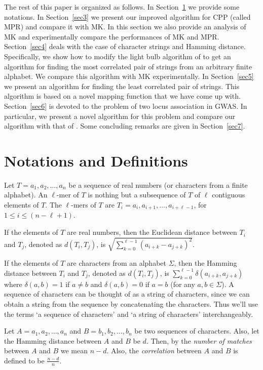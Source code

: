 \documentclass{article}
\theoremstyle{definition}
\theoremstyle{remark}
\begin{document}
The rest of this paper is organized as follows. In Section~\ref{sec2} we provide some notations. In Section~\ref{sec3} we present our improved algorithm for CPP (called MPR) and compare it with MK. In this section we also provide an analysis of MK and experimentally compare the performances of MK and MPR. Section~\ref{sec4} deals with the case of character strings and Hamming distance. Specifically, we show how to modify the light bulb algorithm of \cite{RSJ89} to get an algorithm for finding the most correlated pair of strings from an arbitrary finite alphabet. We compare this algorithm with MK experimentally. In Section~\ref{sec5} we present an algorithm for finding the least correlated pair of strings. This algorithm is based on a novel mapping function that we have come up with. Section~\ref{sec6} is devoted to the problem of two locus association in GWAS. In particular, we present a novel algorithm for this problem and compare our algorithm with that of \cite{PBK11}. Some concluding remarks are given in Section~\ref{sec7}.

\section{Notations and Definitions}\label{sec2}
Let $T=a_1,a_2,\ldots,a_n$ be a sequence of real numbers (or characters from a finite alphabet). An $\ell$-mer of $T$ is nothing but a subsequence of $T$ of $\ell$ contiguous elements of $T$. The $\ell$-mers of $T$ are $T_i=a_i,a_{i+1},\ldots,a_{i+\ell-1}$, for $1\leq i\leq (n-\ell+1)$.

If the elements of $T$ are real numbers, then the Euclidean distance between $T_i$ and $T_j$, denoted as $d(T_i,T_j)$, is $\sqrt{\sum_{k=0}^{\ell-1}(a_{i+k}-a_{j+k})^2}$.

If the elements of $T$ are characters from an alphabet $\Sigma$, then the Hamming distance between $T_i$ and $T_j$, denoted as $d(T_i,T_j)$, is $\sum_{k=0}^{\ell-1}\delta(a_{i+k},a_{j+k})$ where $\delta(a,b)=1$ if $a\neq b$ and $\delta(a,b)=0$ if $a=b$ (for any $a,b\in \Sigma$). A sequence of characters can be thought of as a string of characters, since we can obtain a string from the sequence by concatenating the characters. Thus we'll use the terms `a sequence of characters' and `a string of characters' interchangeably.

Let $A=a_1,a_2,\ldots,a_n$ and $B=b_1,b_2,\ldots,b_n$ be two sequences of characters. Also, let the Hamming distance between $A$ and $B$ be $d$. Then, by the {\em number of matches} between $A$ and $B$ we mean $n-d$. Also, the {\em correlation} between $A$ and $B$ is defined to be $\frac{n-d}{n}$.
\end{document}
